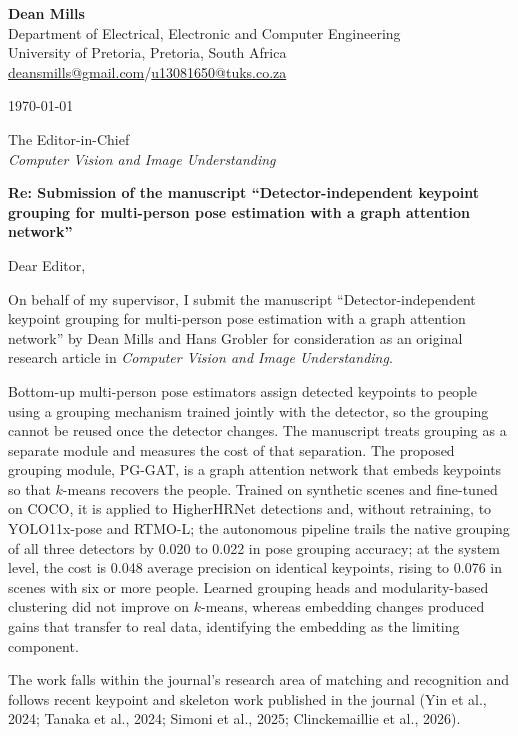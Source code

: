 \documentclass[11pt,a4paper]{article}
\begin{document}
{\large\bfseries Dean Mills}\\
Department of Electrical, Electronic and Computer Engineering\\
University of Pretoria, Pretoria, South Africa\\
\url{deansmills@gmail.com}/\url{u13081650@tuks.co.za}

\vspace{1em}
\today

\vspace{1em}
The Editor-in-Chief\\
\textit{Computer Vision and Image Understanding}

\vspace{1em}
\textbf{Re: Submission of the manuscript ``Detector-independent keypoint grouping for multi-person pose estimation with a graph attention network''}

Dear Editor,

On behalf of my supervisor, I submit the manuscript ``Detector-independent keypoint grouping for multi-person pose estimation with a graph attention network'' by Dean Mills and Hans Grobler for consideration as an original research article in \textit{Computer Vision and Image Understanding}.

Bottom-up multi-person pose estimators assign detected keypoints to people using a grouping mechanism trained jointly with the detector, so the grouping cannot be reused once the detector changes.
The manuscript treats grouping as a separate module and measures the cost of that separation.
The proposed grouping module, PG-GAT, is a graph attention network that embeds keypoints so that $k$-means recovers the people.
Trained on synthetic scenes and fine-tuned on COCO, it is applied to HigherHRNet detections and, without retraining, to YOLO11x-pose and RTMO-L; the autonomous pipeline trails the native grouping of all three detectors by 0.020 to 0.022 in pose grouping accuracy; at the system level, the cost is 0.048 average precision on identical keypoints, rising to 0.076 in scenes with six or more people.
Learned grouping heads and modularity-based clustering did not improve on $k$-means, whereas embedding changes produced gains that transfer to real data, identifying the embedding as the limiting component.

The work falls within the journal's research area of matching and recognition and follows recent keypoint and skeleton work published in the journal (Yin et al., 2024; Tanaka et al., 2024; Simoni et al., 2025; Clinckemaillie et al., 2026).
\end{document}
